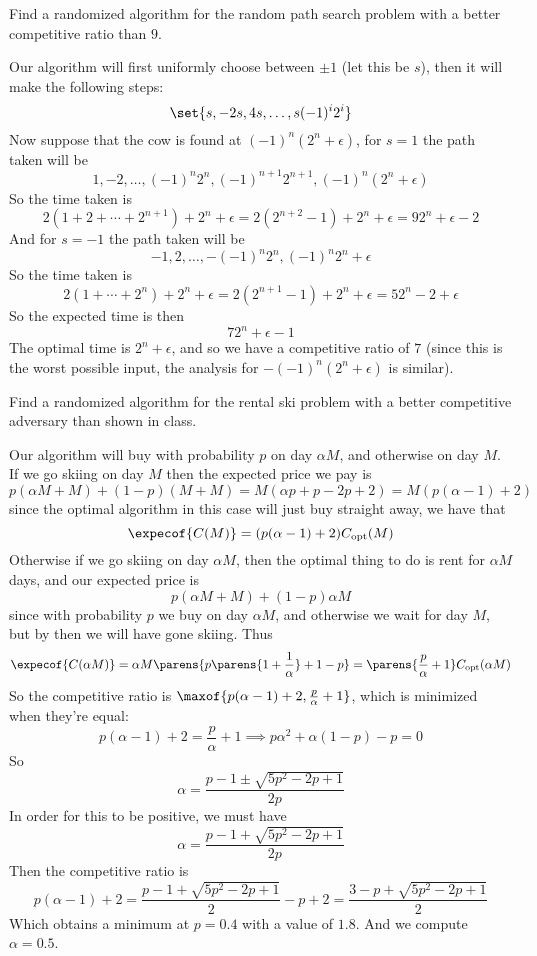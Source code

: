     Find a randomized algorithm for the random path search problem with a better competitive ratio than $9$.

\eexerc

Our algorithm will first uniformly choose between $\pm1$ (let this be $s$), then it will make the following steps:
$$ \set{s,-2s,4s,\dots,s(-1)^i2^i} $$
Now suppose that the cow is found at $(-1)^n(2^n+\epsilon)$, for $s=1$ the path taken will be
$$ 1,-2,\dots,(-1)^n2^n,(-1)^{n+1}2^{n+1},(-1)^n(2^n+\epsilon) $$
So the time taken is
$$ 2(1+2+\cdots+2^{n+1})+2^n+\epsilon = 2(2^{n+2}-1) + 2^n+\epsilon = 92^n+\epsilon-2 $$
And for $s=-1$ the path taken will be
$$ -1,2,\dots,-(-1)^n2^n,(-1)^n2^n+\epsilon $$
So the time taken is
$$ 2(1+\cdots+2^n) + 2^n+\epsilon = 2(2^{n+1}-1) + 2^n+\epsilon = 52^n-2+\epsilon $$
So the expected time is then
$$ 72^n+\epsilon-1 $$
The optimal time is $2^n+\epsilon$, and so we have a competitive ratio of $7$ (since this is the worst possible input, the analysis for $-(-1)^n(2^n+\epsilon)$ is similar).

\bexerc

    Find a randomized algorithm for the rental ski problem with a better competitive adversary than shown in class.

\eexerc

Our algorithm will buy with probability $p$ on day $\alpha M$, and otherwise on day $M$.
If we go skiing on day $M$ then the expected price we pay is
$$ p(\alpha M+M) + (1-p)(M+M) = M(\alpha p+p-2p+2) = M(p(\alpha-1)+2) $$
since the optimal algorithm in this case will just buy straight away, we have that
$$ \expecof{C(M)} = (p(\alpha-1)+2)C_{\rm opt}(M) $$
Otherwise if we go skiing on day $\alpha M$, then the optimal thing to do is rent for $\alpha M$ days, and our expected price is
$$ p(\alpha M+M) + (1-p)\alpha M $$
since with probability $p$ we buy on day $\alpha M$, and otherwise we wait for day $M$, but by then we will have gone skiing.
Thus
$$ \expecof{C(\alpha M)} = \alpha M\parens{p\parens{1+\frac1\alpha}+1-p} = \parens{\frac p\alpha+1}C_{\rm opt}(\alpha M) $$
So the competitive ratio is $\maxof{p(\alpha-1)+2,\frac p\alpha+1}$, which is minimized when they're equal:
$$ p(\alpha-1) + 2 = \frac p\alpha + 1 \implies p\alpha^2 + \alpha(1-p) - p = 0 $$
So
$$ \alpha = \frac{p-1\pm\sqrt{5p^2-2p+1}}{2p} $$
In order for this to be positive, we must have
$$ \alpha = \frac{p-1+\sqrt{5p^2-2p+1}}{2p} $$
Then the competitive ratio is
$$ p(\alpha-1)+2 = \frac{p-1+\sqrt{5p^2-2p+1}}2-p+2 = \frac{3-p+\sqrt{5p^2-2p+1}}2 $$
Which obtains a minimum at $p=0.4$ with a value of $1.8$.
And we compute $\alpha=0.5$.

